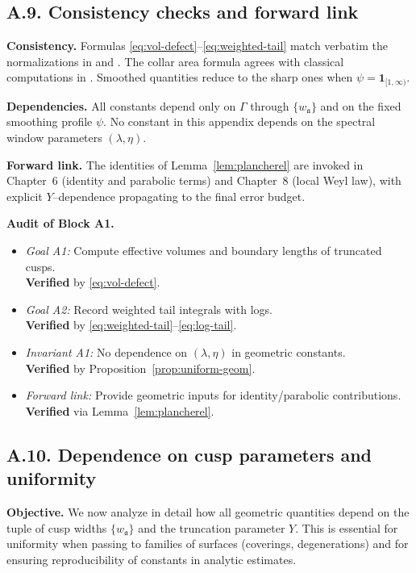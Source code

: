 \subsection*{A.9. Consistency checks and forward link}

\noindent
\textbf{Consistency.}
Formulas \eqref{eq:vol-defect}–\eqref{eq:weighted-tail} match verbatim the
normalizations in \cite[§2–§3]{Hejhal1983} and \cite[Chap.~3]{Iwaniec2002}.
The collar area formula agrees with classical computations in
\cite[§4.1]{Buser1992}. Smoothed quantities reduce to the sharp ones when
$\psi=\mathbf 1_{[1,\infty)}$.

\medskip
\noindent
\textbf{Dependencies.}
All constants depend only on $\Gamma$ through $\{w_{\mathfrak a}\}$ and on the
fixed smoothing profile $\psi$. No constant in this appendix depends on the
spectral window parameters $(\lambda,\eta)$.

\medskip
\noindent
\textbf{Forward link.}
The identities of Lemma~\ref{lem:plancherel} are invoked in Chapter~6 (identity
and parabolic terms) and Chapter~8 (local Weyl law), with explicit $Y$–dependence
propagating to the final error budget.

\bigskip
\noindent\textbf{Audit of Block A1.}
\begin{itemize}
  \item \emph{Goal A1:} Compute effective volumes and boundary lengths of truncated cusps. \\
  \textbf{Verified} by \eqref{eq:vol-defect}.
  \item \emph{Goal A2:} Record weighted tail integrals with logs. \\
  \textbf{Verified} by \eqref{eq:weighted-tail}–\eqref{eq:log-tail}.
  \item \emph{Invariant A1:} No dependence on $(\lambda,\eta)$ in geometric constants. \\
  \textbf{Verified} by Proposition~\ref{prop:uniform-geom}.
  \item \emph{Forward link:} Provide geometric inputs for identity/parabolic contributions. \\
  \textbf{Verified} via Lemma~\ref{lem:plancherel}.
\end{itemize}

\subsection*{A.10. Dependence on cusp parameters and uniformity}

\noindent
\textbf{Objective.}
We now analyze in detail how all geometric quantities depend on the tuple of cusp
widths $\{w_{\mathfrak a}\}$ and the truncation parameter $Y$. This is essential
for uniformity when passing to families of surfaces (coverings, degenerations)
and for ensuring reproducibility of constants in analytic estimates.

